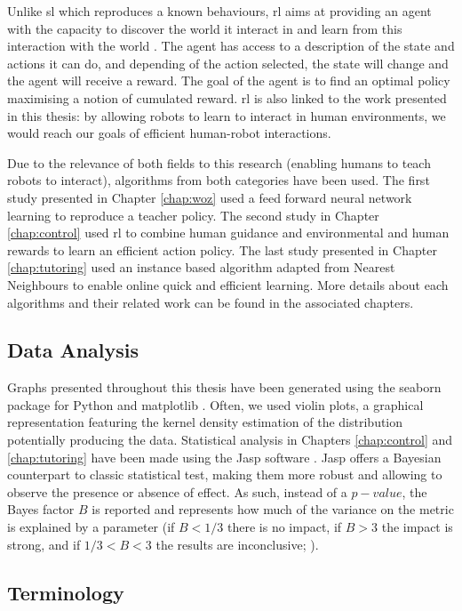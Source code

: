 Unlike \gls{sl} which reproduces a known behaviours, \gls{rl} aims at providing an agent with the capacity to discover the world it interact in and learn from this interaction with the world \citep{sutton1998reinforcement}. The agent has access to a description of the state and actions it can do, and depending of the action selected, the state will change and the agent will receive a reward. The goal of the agent is to find an optimal policy maximising a notion of cumulated reward. \gls{rl} is also linked to the work presented in this thesis: by allowing robots to learn to interact in human environments, we would reach our goals of efficient human-robot interactions.

Due to the relevance of both fields to this research (enabling humans to teach robots to interact), algorithms from both categories have been used. The first study presented in Chapter \ref{chap:woz} used a feed forward neural network learning to reproduce a teacher policy. The second study in Chapter \ref{chap:control} used \gls{rl} to combine human guidance and environmental and human rewards to learn an efficient action policy. The last study presented in Chapter \ref{chap:tutoring} used an instance based algorithm adapted from Nearest Neighbours to enable online quick and efficient learning. More details about each algorithms and their related work can be found in the associated chapters.

\subsection{Data Analysis}
Graphs presented throughout this thesis have been generated using the seaborn package for Python and matplotlib \cite{waskom2017seaborn}. Often, we used violin plots, a graphical representation featuring the kernel density estimation of the distribution potentially producing the data. Statistical analysis in Chapters \ref{chap:control} and \ref{chap:tutoring} have been made using the Jasp software \cite{jasp2018}. Jasp offers a Bayesian counterpart to classic statistical test, making them more robust and allowing to observe the presence or absence of effect. As such, instead of a $p-value$, the Bayes factor $B$ is reported and represents how much of the variance on the metric is explained by a parameter (if $B < 1/3$ there is no impact, if $B > 3$ the impact is strong, and if $1/3<B<3$ the results are inconclusive; \citealt{jeffreys1998theory,dienes2011bayesian}). 

\subsection{Terminology}

